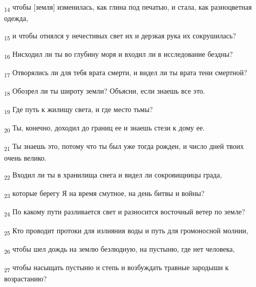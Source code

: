 \begin{tcolorbox}
\textsubscript{14} чтобы [земля] изменилась, как глина под печатью, и стала, как разноцветная одежда,
\end{tcolorbox}
\begin{tcolorbox}
\textsubscript{15} и чтобы отнялся у нечестивых свет их и дерзкая рука их сокрушилась?
\end{tcolorbox}
\begin{tcolorbox}
\textsubscript{16} Нисходил ли ты во глубину моря и входил ли в исследование бездны?
\end{tcolorbox}
\begin{tcolorbox}
\textsubscript{17} Отворялись ли для тебя врата смерти, и видел ли ты врата тени смертной?
\end{tcolorbox}
\begin{tcolorbox}
\textsubscript{18} Обозрел ли ты широту земли? Объясни, если знаешь все это.
\end{tcolorbox}
\begin{tcolorbox}
\textsubscript{19} Где путь к жилищу света, и где место тьмы?
\end{tcolorbox}
\begin{tcolorbox}
\textsubscript{20} Ты, конечно, доходил до границ ее и знаешь стези к дому ее.
\end{tcolorbox}
\begin{tcolorbox}
\textsubscript{21} Ты знаешь это, потому что ты был уже тогда рожден, и число дней твоих очень велико.
\end{tcolorbox}
\begin{tcolorbox}
\textsubscript{22} Входил ли ты в хранилища снега и видел ли сокровищницы града,
\end{tcolorbox}
\begin{tcolorbox}
\textsubscript{23} которые берегу Я на время смутное, на день битвы и войны?
\end{tcolorbox}
\begin{tcolorbox}
\textsubscript{24} По какому пути разливается свет и разносится восточный ветер по земле?
\end{tcolorbox}
\begin{tcolorbox}
\textsubscript{25} Кто проводит протоки для излияния воды и путь для громоносной молнии,
\end{tcolorbox}
\begin{tcolorbox}
\textsubscript{26} чтобы шел дождь на землю безлюдную, на пустыню, где нет человека,
\end{tcolorbox}
\begin{tcolorbox}
\textsubscript{27} чтобы насыщать пустыню и степь и возбуждать травные зародыши к возрастанию?
\end{tcolorbox}
